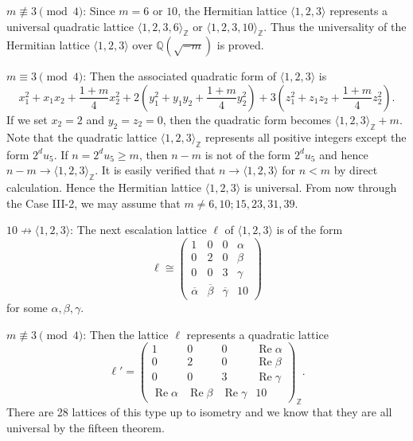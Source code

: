 \documentclass[a4paper,10pt,reqno]{amsart}
\begin{document}
{} $m {\not\equiv} 3 \pmod{4}$: Since $m = 6$ or $10$, the Hermitian lattice ${\langle {1,2,3} \rangle}$
represents a universal quadratic lattice ${\langle {1,2,3,6} \rangle}_{\mathbb{Z}}$ or ${\langle {1,2,3,10} \rangle}_{\mathbb{Z}}$. Thus the
universality of the Hermitian lattice ${\langle {1,2,3} \rangle}$ over ${\mathbb{Q}(\sqrt{{-m}})}$ is proved.

{} $m \equiv 3 \pmod{4}$: Then the associated quadratic form of ${\langle {1,2,3} \rangle}$ is
\[
    x_1^2+x_1x_2+\frac{1+m}4x_2^2 + 2\left(y_1^2+y_1y_2+\frac{1+m}4y_2^2\right) +
    3\left(z_1^2+z_1z_2+\frac{1+m}4z_2^2\right).
\]
If we set $x_2=2$ and $y_2=z_2=0$, then the quadratic form becomes ${\langle {1,2,3} \rangle}_{\mathbb{Z}}+m$. Note that the
quadratic lattice ${\langle {1,2,3} \rangle}_{\mathbb{Z}}$ represents all positive integers except the form $2^{d} u_5$. If
$n =2^{d} u_5 \ge m$, then $n-m$ is not of the form $2^{d} u_5$ and hence $n-m \to {\langle {1,2,3} \rangle}_{\mathbb{Z}}$.
It is easily verified that $n \to {\langle {1,2,3} \rangle}$ for $n < m$ by direct calculation. Hence the
Hermitian lattice ${\langle {1,2,3} \rangle}$ is universal. From now through the Case III-2, we may assume that $m
\ne 6, 10; 15, 23, 31, 39$.

{} $10 \not\to {\langle {1,2,3} \rangle}$: The next escalation lattice $\ell$ of ${\langle {1, 2, 3} \rangle}$ is of
the form
\[
    \ell \cong
    \begin{pmatrix}
        1 & 0 & 0 & \alpha \\
        0 & 2 & 0 & \beta \\
        0 & 0 & 3 & \gamma \\
        {\overline{{\alpha}}} & {\overline{{\beta}}} & {\overline{{\gamma}}} & 10
    \end{pmatrix}
\]
for some $\alpha, \beta, \gamma$.

{} $m {\not\equiv} 3 \pmod 4$: Then the lattice $\ell$
represents a quadratic lattice
\[
    \ell' = \begin{pmatrix}
        1 & 0 & 0 & {\operatorname{Re}}{\alpha} \\
        0 & 2 & 0 & {\operatorname{Re}}{\beta} \\
        0 & 0 & 3 & {\operatorname{Re}}{\gamma} \\
        {\operatorname{Re}}{\alpha} & {\operatorname{Re}}{\beta} & {\operatorname{Re}}{\gamma} & 10
    \end{pmatrix}_{\mathbb{Z}}.
\]
There are 28 lattices of this type up to isometry and we know that they are all universal by the
fifteen theorem.
\end{document}
